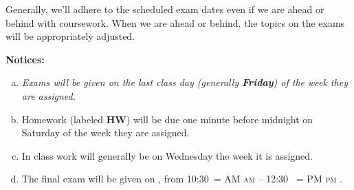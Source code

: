 \documentclass[12pt]{article}
\makeatletter
\newcounter{ex}\setcounter{ex}{0}
\newenvironment{alphalist}{
  \begin{enumerate}[(a)]
    \addtolength{\itemsep}{-0.5\itemsep}}
  {\end{enumerate}}
\DeclareRobustCommand{\maybefakesc}[1]{%
  \ifnum\pdfstrcmp{\f@series}{\bfdefault}=\z@
    {\fontsize{\dimexpr0.8\dimexpr\f@size pt\relax}{0}\selectfont\uppercase{#1}}%
  \else
    \textsc{#1}%
  \fi
}
\newcommand\AM{\,\maybefakesc{am}\xspace}
\newcommand\PM{\,\maybefakesc{pm}\xspace}
\newcommand{\finaldateandtime}{\printdate{15/12/\the\year},{} from 10:30\AM{} -- 12:30 \PM}
\makeatother
\begin{document}
Generally, we'll adhere to the scheduled exam dates even if we are ahead or behind with coursework.  
When we are ahead or behind, the topics on the exams will be appropriately adjusted.  



\noindent \textbf{Notices:}


\begin{alphalist}
   \item \emph{Exams will be given on  the last class day (generally \textbf{Friday})  of the week they are assigned.}
   

    \item Homework (labeled \textbf{HW}) will be due one minute before midnight on  Saturday of the week they are assigned.  

    \item In class work will generally  be on Wednesday the week it is assigned.  
    
    \item The final exam will be given on \finaldateandtime.
    
\end{alphalist}
\end{document}
